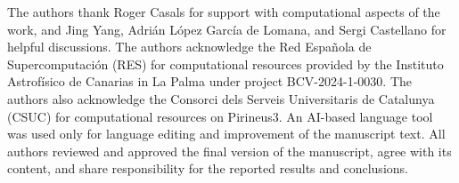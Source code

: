 \documentclass[journal=jpcbfk,manuscript=article]{achemso}
\begin{document}
\begin{acknowledgement}

The authors thank Roger Casals for support with computational aspects of the work, and Jing Yang, Adrián López García de Lomana, and Sergi Castellano for helpful discussions. The authors acknowledge the Red Española de Supercomputación (RES) for computational resources provided by the Instituto Astrofísico de Canarias in La Palma under project BCV-2024-1-0030. The authors also acknowledge the Consorci dels Serveis Universitaris de Catalunya (CSUC) for computational resources on Pirineus3. An AI-based language tool was used only for language editing and improvement of the manuscript text. All authors reviewed and approved the final version of the manuscript, agree with its content, and share responsibility for the reported results and conclusions.

\end{acknowledgement}


\end{document}
